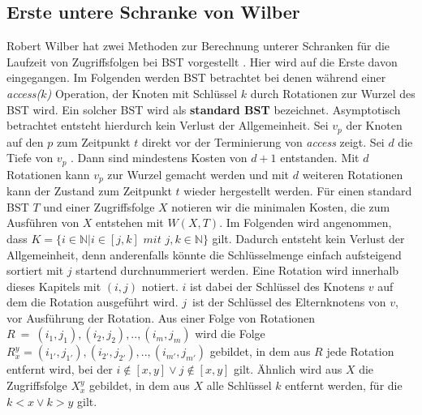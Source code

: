 \documentclass[a4paper,12pt]{article}
\begin{document}
\subsection{Erste untere Schranke von Wilber} \label{wilberBound}
Robert Wilber hat zwei Methoden zur Berechnung unterer Schranken für die Laufzeit von Zugriffsfolgen bei BST vorgestellt \cite{wilberLowerBounds}. Hier wird auf die Erste davon eingegangen. Im Folgenden werden BST betrachtet bei denen während einer \textit{access($k$)} Operation, der Knoten mit Schlüssel $k$ durch Rotationen zur Wurzel des BST wird. Ein solcher BST wird als \textbf{standard BST} bezeichnet. Asymptotisch betrachtet entsteht hierdurch kein Verlust der Allgemeinheit. Sei $v_p$ der Knoten auf den $p$ zum Zeitpunkt $t$ direkt vor der Terminierung von \textit{access} zeigt. Sei $d$ die Tiefe von $v_p$ . Dann sind mindestens Kosten von $d + 1$ entstanden. Mit $d$ Rotationen kann $v_p$ zur Wurzel gemacht werden und mit $d$ weiteren Rotationen kann der Zustand zum Zeitpunkt $t$ wieder hergestellt werden.
Für einen standard BST $T$ und einer Zugriffsfolge $X$ notieren wir die minimalen Kosten, die zum Ausführen von $X$ entstehen mit $W(X, T)$. Im Folgenden wird angenommen, dass 
$K = \{  i \in \mathbb{N} \vert i \in \left[j,k\right] \textit{ mit } j,k \in  \mathbb{N} \} $ gilt. Dadurch entsteht kein Verlust der Allgemeinheit, denn anderenfalls könnte die Schlüsselmenge einfach aufsteigend sortiert mit $j$ startend durchnummeriert werden. Eine Rotation wird innerhalb dieses Kapitels mit $\left(i, j\right)$ notiert. $i$ ist dabei der Schlüssel des Knotens $v$ auf dem die Rotation ausgeführt wird. $j$~ist der Schlüssel des Elternknotens von $v$, vor Ausführung der Rotation. Aus einer Folge von Rotationen $R~=~\left(i_1,j_1 \right),\left(i_2,j_2 \right),..,\left(i_m,j_m \right)$ wird die Folge  $R^y_x = \left(i_{1'},j_{1'}\right),\left(i_{2'},j_{2'} \right),..,\left(i_{m'},j_{m'} \right)$ gebildet, in dem aus $R$ jede Rotation entfernt wird, bei der $i\notin \left[x,y\right] \lor j\notin \left[x,y\right]$ gilt. Ähnlich wird aus $X$ die Zugriffsfolge $X^y_x$ gebildet, in dem aus $X$ alle Schlüssel $k$ entfernt werden, für die $k < x  \lor k > y$ gilt.
\end{document}
